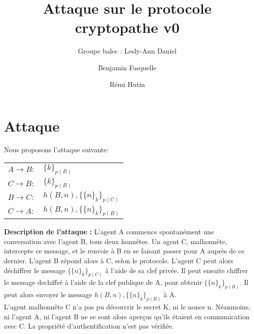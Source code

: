 \documentclass[11pt,a4paper]{article}
\author{Groupe balec : Lesly-Ann Daniel \and Benjamin Fasquelle \and Rémi Hutin}
\title{Attaque sur le protocole cryptopathe v0}
\date{}
\begin{document}
\maketitle


\section{Attaque}

Nous proposons l'attaque suivante:


\begin{table}[!h]
\centering
\begin{tabular}{ll}
$A \rightarrow B:$ & $\{k\}_{p(B)} $ \\
$C \rightarrow B:$ & $\{k\}_{p(B)} $ \\
$B \rightarrow C:$ & $h(B,n), \{\{n\}_k\}_{p(C)}$\\
$C \rightarrow A:$ & $h(B,n), \{\{n\}_k\}_{p(B)}$\\
\end{tabular}
\end{table}



\textbf{Description de l'attaque :}
L'agent A commence spontanément une conversation avec l'agent B, tous deux honnêtes.
Un agent C, malhonnête, intercepte ce message, et le renvoie à B en se faisant passer pour A auprès de ce dernier.
L'agent B répond alors à C, selon le protocole.
L'agent C peut alors déchiffrer le message $\{\{n\}_k\}_{p(C)}$ à l'aide de sa clef privée. Il peut ensuite chiffrer le message dechiffré à l'aide de la clef publique de A, pour obtenir $\{\{n\}_k\}_{p(B)}$. Il peut alors envoyer le message $h(B,n), \{\{n\}_k\}_{p(B)}$ à A. \\

L'agent malhonnête C n'a pas pu découvrir le secret K, ni le nonce n.
Néanmoins, ni l'agent A, ni l'agent B ne se sont alors aperçus qu'ils étaient en communication avec C. 
La propriété d'authentification n'est pas vérifiée.
\end{document}
